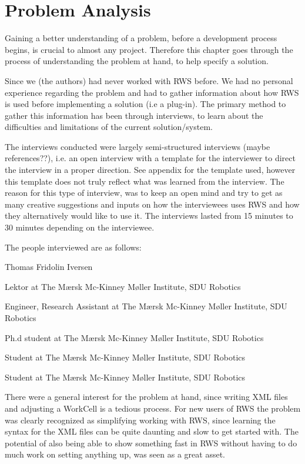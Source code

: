 \section{Problem Analysis}
Gaining a better understanding of a problem, before a development process begins, is crucial to almost any project. Therefore this chapter goes through the process of understanding the problem at hand, to help specify a solution.  

Since we (the authors) had never worked with RWS before. We had no personal experience regarding the problem and had to gather information about how RWS is used before implementing a solution (i.e a plug-in). The primary method to gather this information has been through interviews, to learn about the difficulties and limitations of the current solution/system.

The interviews conducted were largely semi-structured interviews (maybe references??), i.e. an open interview with a template for the interviewer to direct the interview in a proper direction. See appendix for the template used, however this template does not truly reflect what was learned from the interview. The reason for this type of interview, was to keep an open mind and try to get as many creative suggestions and inputs on how the interviewees uses RWS and how they alternatively would like to use it. The interviews lasted from 15 minutes to 30 minutes depending on the interviewee.

The people interviewed are as follows:

\begin{labeling}{Thomas Fridolin Iversen}
\item [Lars-Peter Ellekilde] Lektor at The Mærsk Mc-Kinney Møller Institute, SDU Robotics
\item [Thomas Nicky Thuelsen] Engineer, Research Assistant at The Mærsk Mc-Kinney Møller Institute, SDU Robotics
\item [Thomas Fridolin Iversen] Ph.d student at The Mærsk Mc-Kinney Møller Institute, SDU Robotics
\item [Michael Kjær Schmidt] Student at The Mærsk Mc-Kinney Møller Institute, SDU Robotics
\item [Kristian Møller Hansen] Student at The Mærsk Mc-Kinney Møller Institute, SDU Robotics
\end{labeling}

There were a general interest for the problem at hand, since writing XML files and adjusting a WorkCell is a tedious process. For new users of RWS the problem was clearly recognized as simplifying working with RWS, since learning the syntax for the XML files can be quite daunting and slow to get started with. The potential of also being able to show something fast in RWS without having to do much work on setting anything up, was seen as a great asset.

